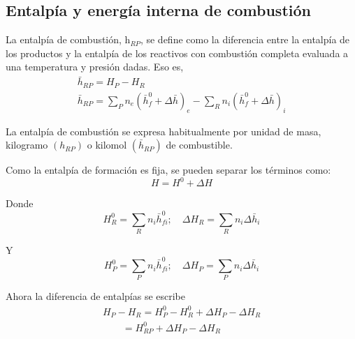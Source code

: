 \subsection{Entalpía y energía interna de combustión}
\par La entalpía de combustión, h$_{RP}$, se define como la diferencia entre la entalpía de los productos y la entalpía de los reactivos con combustión completa evaluada a una temperatura y presión dadas. Eso es,
\begin{equation}
\begin{gathered}
\bar h_{RP} = H_P - H_R \\
\bar h_{RP} = \sum_P n_e(\bar h^0_f + \Delta \bar h)_e - \sum_R n_i(\bar h^0_f + \Delta \bar h)_i
\end{gathered}
\end{equation}
\par La entalpía de combustión se expresa habitualmente por unidad de masa, kilogramo $(h_{RP})$ o kilomol $(\bar h_{RP})$ de combustible.
\par Como la entalpía de formación es fija, se pueden separar los términos como:
\begin{equation}
    H = H^0 + \Delta H
\end{equation}
\par Donde
\begin{equation}
    H^0_{R} = \sum_R n_i \bar h^0_{fi} ; \quad \Delta H_{R} = \sum_R n_i \Delta \bar h_{i}
\end{equation}
\par Y
\begin{equation}
    H^0_{P} = \sum_P n_i \bar h^0_{fi} ; \quad \Delta H_{P} = \sum_P n_i \Delta \bar h_{i}
\end{equation}
\par Ahora la diferencia de entalpías se escribe
\begin{equation}
\begin{gathered}
    H_P - H_R = H^0_P - H^0_R + \Delta H_P - \Delta H_R \\
    \quad \quad = H^0_{RP} + \Delta H_P - \Delta H_R
\end{gathered}
\end{equation}


